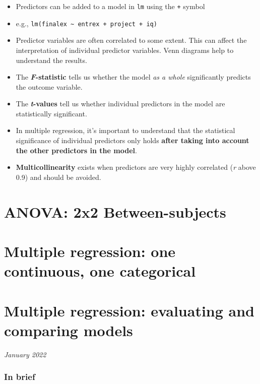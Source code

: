 \documentclass[
]{book}
\theoremstyle{definition}
\theoremstyle{definition}
\theoremstyle{definition}
\theoremstyle{definition}
\theoremstyle{remark}
\begin{document}
\begin{itemize}
\item
  Predictors can be added to a model in \texttt{lm} using the \texttt{+} symbol
\item
  e.g., \texttt{lm(finalex\ \textasciitilde{}\ entrex\ +\ project\ +\ iq)}
\item
  Predictor variables are often correlated to some extent. This can affect the interpretation of individual predictor variables. Venn diagrams help to understand the results.
\item
  The \textbf{\emph{F}-statistic} tells us whether the model \emph{as a whole} significantly predicts the outcome variable.
\item
  The \textbf{\emph{t}-values} tell us whether individual predictors in the model are statistically significant.
\item
  In multiple regression, it's important to understand that the statistical significance of individual predictors only holds \textbf{after taking into account the other predictors in the model}.
\item
  \textbf{Multicollinearity} exists when predictors are very highly correlated (\emph{r} above 0.9) and should be avoided.
\end{itemize}

\hypertarget{anova-2x2-between-subjects}{%
\chapter{ANOVA: 2x2 Between-subjects}\label{anova-2x2-between-subjects}}

\hypertarget{multiple-regression-one-continuous-one-categorical}{%
\chapter{Multiple regression: one continuous, one categorical}\label{multiple-regression-one-continuous-one-categorical}}

\hypertarget{multiple3}{%
\chapter{Multiple regression: evaluating and comparing models}\label{multiple3}}

\emph{January 2022}

\hypertarget{in-brief-1}{%
\subsection{In brief}\label{in-brief-1}}
\end{document}
